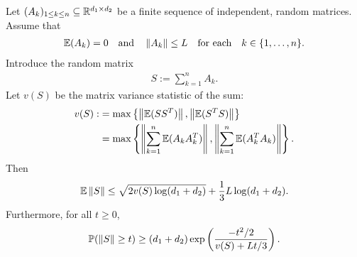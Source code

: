 \begin{theorem}
  Let $(A_k)_{1\le k \le n}\subseteq\mathbb{R}^{d_1\times d_2}$ be a finite sequence of independent, random matrices. Assume that
    \begin{gather}
      \mathbb{E}(A_k)=0\quad\text{and}\quad\left\lVert A_k\right\rVert\le L \quad \text{for each}\quad  k\in \{1,\ldots,n\}.
    \end{gather}
    Introduce the random matrix
      \begin{gather}
        S:=\sum_{k=1}^n A_k.
      \end{gather}
    Let $v(S)$ be the matrix variance statistic of the sum:
      \begin{align}
        v(S):&=\max\left\{ \left\lVert\mathbb{E}(SS^T)\right\rVert, \left\lVert\mathbb{E}(S^T S)\right\rVert \right\}\\
             &=\max\left\{ \left\lVert\sum_{k=1}^n\mathbb{E}(A_kA_k^T)\right\rVert, \left\lVert\sum_{k=1}^n\mathbb{E}(A_k^T A_k)\right\rVert \right\}.
      \end{align}
    Then
      \begin{align}
        \mathbb{E}\left\lVert S\right\rVert\le \sqrt{2v(S)\log(d_1+d_2)} + \frac{1}{3}L\log(d_1+d_2).
      \end{align}
    Furthermore, for all $t\ge 0$,
      \begin{gather}
        \mathbb{P}(\left\lVert S\right\rVert\ge t)\ge(d_1+d_2)\exp\left(\frac{-t^2/2}{v(S)+Lt/3} \right).
      \end{gather}
\end{theorem}

